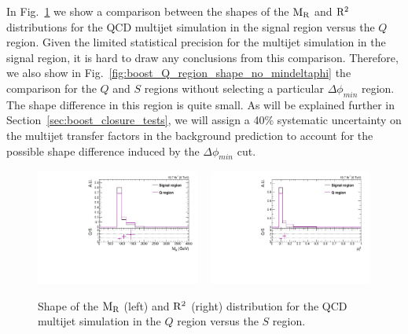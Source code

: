 % 
% 
% 


In Fig.~\ref{fig:boost_Q_region_shape} we show a comparison between the shapes of the $\mathrm{M_R}$ and
$\mathrm{R^2}$ distributions for the QCD multijet simulation in the signal region versus the $Q$ region.
Given the limited statistical precision for the multijet simulation in the signal region, it is
hard to draw any conclusions from this comparison. Therefore, we also show in
Fig.~\ref{fig:boost_Q_region_shape_no_mindeltaphi} the comparison for the $Q$ and $S$ regions
without selecting a particular $\Delta\phi_{min}$ region. The shape difference in this
region is quite small. As will be explained further in Section~\ref{sec:boost_closure_tests}, we
will assign a 40\% systematic uncertainty on the multijet transfer factors in the background
prediction to account for the possible shape difference induced by the $\Delta\phi_{min}$ cut. 

\begin{figure}[htbp]
\centering
\includegraphics[width=0.48\textwidth]{figures/razor_selection/shapeplots/MR_comparison_QCD_SIG}
~
\includegraphics[width=0.48\textwidth]{figures/razor_selection/shapeplots/R2_comparison_QCD_SIG}
\caption{Shape of the $\mathrm{M_R}$ (left) and $\mathrm{R^2}$ (right) distribution for the QCD multijet simulation
in the $Q$ region versus the $S$ region. 
\label{fig:boost_Q_region_shape}}
\end{figure}

